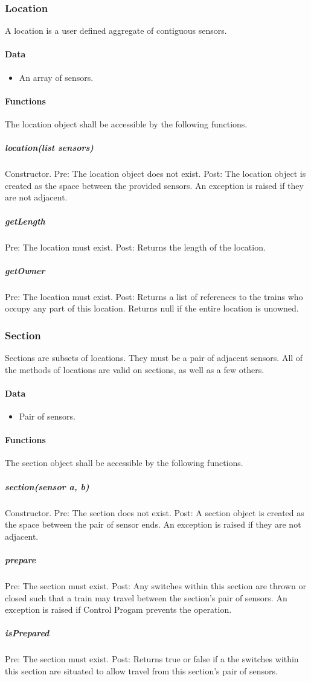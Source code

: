 \documentclass[a4paper,11pt,notitlepage]{article}
\def\CS{Control Progam\xspace} \def\LC{Local Copy of Train State\xspace} \def\TN{Track Node\xspace}
\begin{document}
\subsubsection{Location}
A location is a user defined aggregate of contiguous sensors.
\paragraph{Data}
\begin{itemize}
\item An array of sensors.
\end{itemize}
\paragraph{Functions}
The location object shall be accessible by the following functions.
\subparagraph{location(list sensors)} Constructor. Pre: The location object does not exist. Post: The location object is created as the space between the provided sensors. An exception is raised if they are not adjacent.
\subparagraph{getLength} Pre: The location must exist. Post: Returns the length of the location.
\subparagraph{getOwner} Pre: The location must exist. Post: Returns a list of references to the trains who occupy any part of this location. Returns null if the entire location is unowned. 

\subsubsection{Section}
Sections are subsets of locations. They must be a pair of adjacent sensors. All of the methods of locations are valid on sections, as well as a few others.
\paragraph{Data}
\begin{itemize}
\item Pair of sensors.
\end{itemize}
\paragraph{Functions}
The section object shall be accessible by the following functions.
\subparagraph{section(sensor a, b)} Constructor. Pre: The section does not exist. Post: A section object is created as the space between the pair of sensor ends. An exception is raised if they are not adjacent.
\subparagraph{prepare} Pre: The section must exist. Post: Any switches within this section are thrown or closed such that a train may travel between the section's pair of sensors. An exception is raised if \CS prevents the operation.
\subparagraph{isPrepared} Pre: The section must exist. Post: Returns true or false if a the switches within this section are situated to allow travel from this section's pair of sensors.
\end{document}
